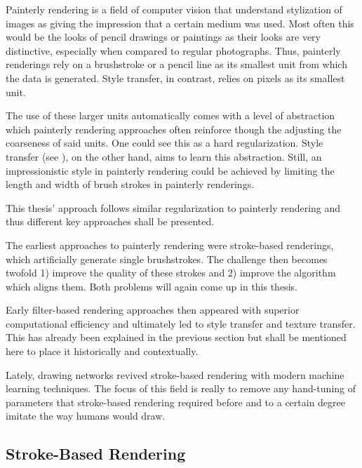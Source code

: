 
Painterly rendering is a field of computer vision that understand stylization of images as giving the impression that a certain medium was used.
Most often this would be the looks of pencil drawings or paintings as their looks are very distinctive, especially when compared to regular photographs.
Thus, painterly renderings rely on a brushstroke or a pencil line as its smallest unit from which the data is generated.
Style transfer, in contrast, relies on pixels as its smallest unit.

The use of these larger units automatically comes with a level of abstraction which painterly rendering approaches often reinforce though the adjusting the coarseness of said units.
One could see this as a hard regularization.
Style transfer (see ), on the other hand, aims to learn this abstraction.
Still, an impressionistic style in painterly rendering could be achieved by limiting the length and width of brush strokes in painterly renderings.

This thesis' approach follows similar regularization to painterly rendering and thus different key approaches shall be presented.

The earliest approaches to painterly rendering were stroke-based renderings, which artificially generate single brushstrokes.
The challenge then becomes twofold 1) improve the quality of these strokes and 2) improve the algorithm which aligns them.
Both problems will again come up in this thesis.

Early filter-based rendering approaches then appeared with superior computational efficiency and ultimately led to style transfer and texture transfer.
This has already been explained in the previous section but shall be mentioned here to place it historically and contextually.

Lately, drawing networks revived stroke-based rendering with modern machine learning techniques.
The focus of this field is really to remove any hand-tuning of parameters that stroke-based rendering required before and to a certain degree imitate the way humans would draw.


\subsection{Stroke-Based Rendering}

